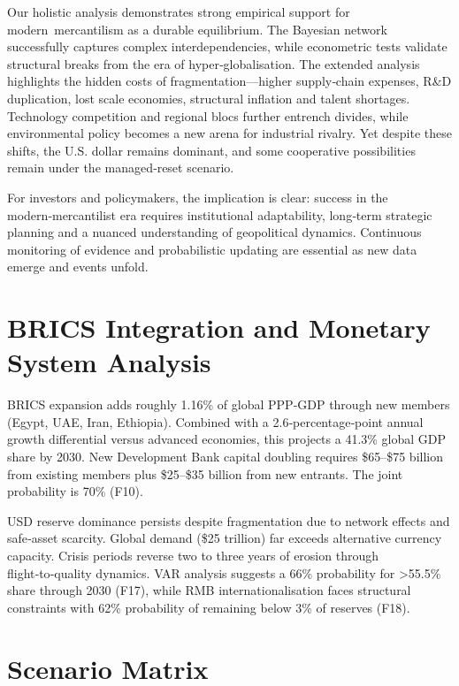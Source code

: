 \documentclass{article}
\begin{document}
Our holistic analysis demonstrates strong empirical support for modern mercantilism as a durable equilibrium.  The Bayesian network successfully captures complex interdependencies, while econometric tests validate structural breaks from the era of hyper‑globalisation.  The extended analysis highlights the hidden costs of fragmentation—higher supply‑chain expenses, R\&D duplication, lost scale economies, structural inflation and talent shortages.  Technology competition and regional blocs further entrench divides, while environmental policy becomes a new arena for industrial rivalry.  Yet despite these shifts, the U.S. dollar remains dominant, and some cooperative possibilities remain under the managed‑reset scenario.

For investors and policymakers, the implication is clear: success in the modern‑mercantilist era requires institutional adaptability, long‑term strategic planning and a nuanced understanding of geopolitical dynamics.  Continuous monitoring of evidence and probabilistic updating are essential as new data emerge and events unfold.

\section{BRICS Integration and Monetary System Analysis}

BRICS expansion adds roughly 1.16\% of global PPP‑GDP through new members (Egypt, UAE, Iran, Ethiopia).  Combined with a 2.6‑percentage‑point annual growth differential versus advanced economies, this projects a 41.3\% global GDP share by 2030.  New Development Bank capital doubling requires \$65–\$75 billion from existing members plus \$25–\$35 billion from new entrants.  The joint probability is 70\% (F10).

USD reserve dominance persists despite fragmentation due to network effects and safe‑asset scarcity.  Global demand (\$25 trillion) far exceeds alternative currency capacity.  Crisis periods reverse two to three years of erosion through flight‑to‑quality dynamics.  VAR analysis suggests a 66\% probability for >55.5\% share through 2030 (F17), while RMB internationalisation faces structural constraints with 62\% probability of remaining below 3\% of reserves (F18).

\section{Scenario Matrix}
\end{document}
